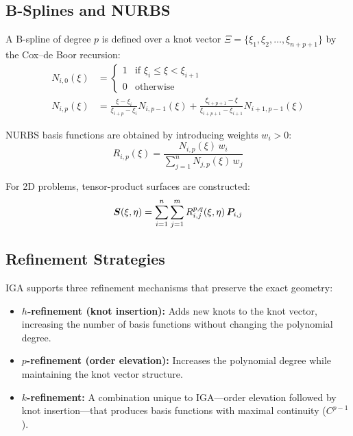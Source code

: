 \subsection{B-Splines and NURBS}

A B-spline of degree $p$ is defined over a knot vector $\Xi = \{\xi_1, \xi_2, \ldots, \xi_{n+p+1}\}$ by the Cox--de Boor recursion:
\begin{align}
    N_{i,0}(\xi) &= \begin{cases} 1 & \text{if } \xi_i \leq \xi < \xi_{i+1} \\ 0 & \text{otherwise} \end{cases} \\[6pt]
    N_{i,p}(\xi) &= \frac{\xi - \xi_i}{\xi_{i+p} - \xi_i} N_{i,p-1}(\xi) + \frac{\xi_{i+p+1} - \xi}{\xi_{i+p+1} - \xi_{i+1}} N_{i+1,p-1}(\xi)
\end{align}

NURBS basis functions are obtained by introducing weights $w_i > 0$:
\begin{equation}
    R_{i,p}(\xi) = \frac{N_{i,p}(\xi) \, w_i}{\sum_{j=1}^{n} N_{j,p}(\xi) \, w_j}
    \label{eq:nurbs-basis}
\end{equation}

For 2D problems, tensor-product surfaces are constructed:
\begin{equation}
    \bm{S}(\xi, \eta) = \sum_{i=1}^{n} \sum_{j=1}^{m} R_{i,j}^{p,q}(\xi, \eta) \, \bm{P}_{i,j}
\end{equation}

\subsection{Refinement Strategies}

IGA supports three refinement mechanisms that preserve the exact geometry:
\begin{itemize}
    \item \textbf{$h$-refinement (knot insertion):} Adds new knots to the knot vector, increasing the number of basis functions without changing the polynomial degree.
    \item \textbf{$p$-refinement (order elevation):} Increases the polynomial degree while maintaining the knot vector structure.
    \item \textbf{$k$-refinement:} A combination unique to IGA---order elevation followed by knot insertion---that produces basis functions with maximal continuity ($C^{p-1}$).
\end{itemize}


